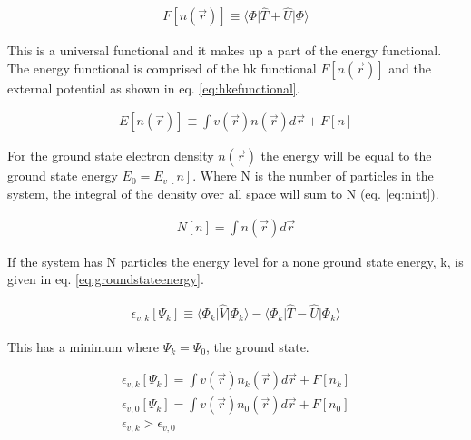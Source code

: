 \begin{equation}
\begin{split}
F[n(\vec{r})] \equiv \langle \Phi \lvert \hat{T} + \hat{U} \rvert \Phi \rangle 
\end{split}
\label{eq:hkffunctional}
\end{equation}

This is a universal functional\cite{hohenbergkohn} and it makes up a part of the energy functional.  The energy functional is comprised of the \acrshort{hk} functional $F[n(\vec{r})]$ and the external potential as shown in eq. \ref{eq:hkefunctional}.

\begin{equation}
\begin{split}
E[n(\vec{r})] \equiv \int v(\vec{r}) n(\vec{r}) d\vec{r} + F[n]
\end{split}
\label{eq:hkefunctional}
\end{equation}

For the ground state electron density $n(\vec{r})$ the energy will be equal to the ground state energy $E_0 = E_v[n]$.  Where N is the number of particles in the system, the integral of the density over all space will sum to N (eq. \ref{eq:nint}).

\begin{equation}
\begin{split}
N[n] = \int n(\vec{r}) d\vec{r}
\end{split}
\label{eq:nint}
\end{equation}

If the system has N particles the energy level for a none ground state energy, k, is given in eq. \ref{eq:groundstateenergy}.

\begin{equation}
\begin{split}
\epsilon_{v,k} [\Psi_k] \equiv \langle \Phi_k \lvert \hat{V} \rvert \Phi_k \rangle - \langle \Phi_k \lvert \hat{T} - \hat{U} \rvert \Phi_k \rangle 
\end{split}
\label{eq:groundstateenergy}
\end{equation}

This has a minimum where $\Psi_k = \Psi_0$, the ground state.

\begin{equation}
\begin{split}
\epsilon_{v,k} [\Psi_k] = \int v(\vec{r}) n_k(\vec{r}) d\vec{r} + F[n_k] \\
\epsilon_{v,0} [\Psi_k] = \int v(\vec{r}) n_0(\vec{r}) d\vec{r} + F[n_0] \\
\epsilon_{v,k} > \epsilon_{v,0}
\end{split}
\label{eq:groundstateenergy1}
\end{equation}


